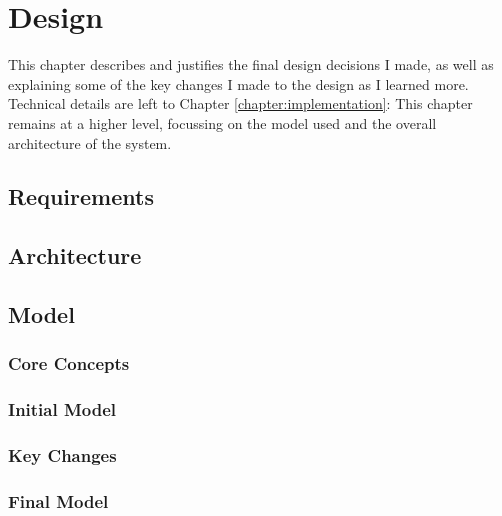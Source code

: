 \chapter{Design}
\label{chapter:design}
  This chapter describes and justifies the final design decisions I made, as well as explaining some of the key changes I made to the design as I learned more. Technical details are left to Chapter \ref{chapter:implementation}: This chapter remains at a higher level, focussing on the model used and the overall architecture of the system.

  \section{Requirements}
  \section{Architecture}
  \section{Model}
    \subsection{Core Concepts}
    \subsection{Initial Model}
    \subsection{Key Changes}
    \subsection{Final Model}
